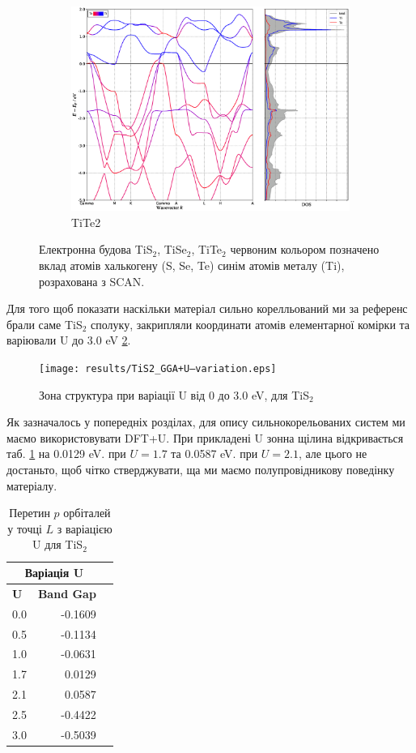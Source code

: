 \begin{figure}[H]
\begin{subfigure}[b]{.4\textwidth}
    	\includegraphics[width=\linewidth]{img/results/TiTe2_SCAN_relaxed_BAND+DOS}
    	\caption{
    	TiTe2}
	\end{subfigure}
\caption{Електронна будова TiS$_2$, TiSe$_2$, TiTe$_2$ червоним кольором позначено вклад атомів халькогену (S, Se, Te) синім атомів металу (Ti), розрахована з SCAN.}
\label{fig:bandstructireSCAN}
\end{figure}

Для того щоб показати наскільки матеріал сильно корелльований ми за референс брали саме TiS$_2$ сполуку, закрипляли координати атомів елементарної комірки та варіювали U до 3.0 eV \ref{fig:variationU_GGA}. 

\begin{figure}
	\texttt{[image: results/TiS2\_GGA+U--variation.eps]}
	\caption{Зона структура при варіації U від 0 до 3.0 eV, для TiS$_2$}
	\label{fig:variationU_GGA}
\end{figure}

Як зазначалось у попередніх розділах, для опису сильнокорельованих систем ми маємо використовувати DFT+U. При прикладені U зонна щілина відкривається таб. \ref{tab:VariationU} на 0.0129 eV. при $U=1.7$ та 0.0587 eV. при $U=2.1$, але цього не достаньто, щоб чітко стверджувати, ща ми маємо полупровідникову поведінку матеріалу. 

\begin{table}[H]\centering
\scriptsize
\begin{tabular}{lrr}\toprule
\multicolumn{2}{c}{\textbf{Варіація U }} \\\midrule
\multirow{2}{*}{\textbf{U}} &\multirow{2}{*}{\textbf{Band Gap}} \\
& \\
0.0 & -0.1609 \\
0.5 &-0.1134 \\
1.0 &-0.0631 \\
1.7 &0.0129 \\
2.1 &0.0587 \\
2.5 &-0.4422 \\
3.0 &-0.5039 \\
\bottomrule
\end{tabular}
\caption{Перетин $p$ орбіталей у точці $L$ з варіацією U для TiS$_2$}\label{tab:VariationU}
\end{table}

